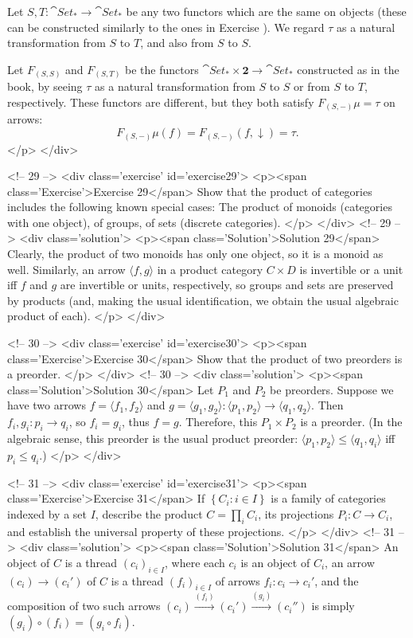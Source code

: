 	Let $S,T\colon\cat{Set}_\ast\to\cat{Set}_\ast$ be any two functors which are the same on objects (these can be constructed similarly to the ones in Exercise ).	We regard $\tau$ as a natural transformation from $S$ to $T$, and also from $S$ to $S$.
	
	Let $F_{(S,S)}$ and $F_{(S,T)}$ be the functors $\cat{Set}_\ast\times\mathbf{2}\to\cat{Set}_\ast$ constructed as in the book, by seeing $\tau$ as a natural transformation from $S$ to $S$ or from $S$ to $T$, respectively. These functors are different, but they both satisfy $F_{(S,-)}\mu=\tau$ on arrows:
	\[F_{(S,-)}\mu(f)=F_{(S,-)}(f,\downarrow)=\tau.\]
</p>
</div>

<!-- 29 -->
<div class='exercise' id='exercise29'>
<p><span class='Exercise'>Exercise 29</span>
Show that the product of categories includes the following known special cases: The product of monoids (categories with one object), of groups, of sets (discrete categories).
</p>
</div>
<!-- 29 -->
<div class='solution'>
<p><span class='Solution'>Solution 29</span>
Clearly, the product of two monoids has only one object, so it is a monoid as well. Similarly, an arrow $\langle f,g\rangle$ in a product category $C\times D$ is invertible or a unit iff $f$ and $g$ are invertible or units, respectively, so groups and sets are preserved by products (and, making the usual identification, we obtain the usual algebraic product of each).
</p>
</div>

<!-- 30 -->
<div class='exercise' id='exercise30'>
<p><span class='Exercise'>Exercise 30</span>
Show that the product of two preorders is a preorder.
</p>
</div>
<!-- 30 -->
<div class='solution'>
<p><span class='Solution'>Solution 30</span>
Let $P_1$ and $P_2$ be preorders. Suppose we have two arrows $f=\langle f_1,f_2\rangle$ and $g=\langle g_1, g_2\rangle:\langle p_1,p_2\rangle\to\langle q_1,q_2\rangle$. Then $f_i,g_i:p_i\to q_i$, so $f_i=g_i$, thus $f=g$. Therefore, this $P_1\times P_2$ is a preorder. (In the algebraic sense, this preorder is the usual product preorder: $\langle p_1,p_2\rangle\leq\langle q_1,q_i\rangle$ iff $p_i\leq q_i$.)
</p>
</div>

<!-- 31 -->
<div class='exercise' id='exercise31'>
<p><span class='Exercise'>Exercise 31</span>
If $\left\{C_i:i\in I\right\}$ is a family of categories indexed by a set $I$, describe the product $C=\prod_i C_i$, its projections $P_i:C\to C_i$, and establish the universal property of these projections.
</p>
</div>
<!-- 31 -->
<div class='solution'>
<p><span class='Solution'>Solution 31</span>
An object of $C$ is a thread $(c_i)_{i\in I}$, where each $c_i$ is an object of $C_i$, an arrow $(c_i)\to (c_i')$ of $C$ is a thread $(f_i)_{i\in I}$ of arrows $f_i:c_i\to c_i'$, and the composition of two such arrows $(c_i)\overset{(f_i)}{\to}(c_i')\overset{(g_i)}{\to}(c_i'')$ is simply $(g_i)\circ(f_i)=(g_i\circ f_i)$.

